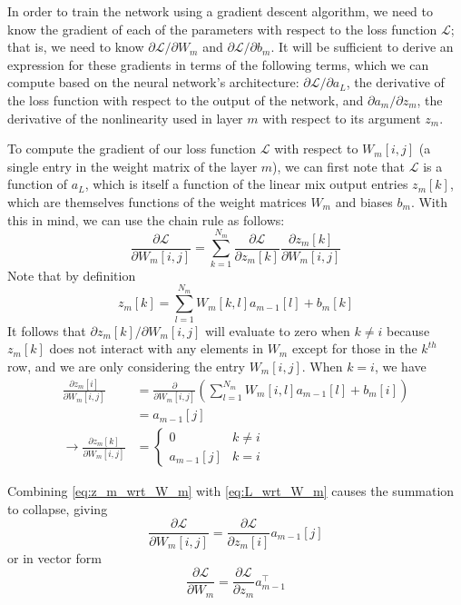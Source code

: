 In order to train the network using a gradient descent algorithm, we need to know the gradient of each of the parameters with respect to the loss function $\mathcal{L}$; that is, we need to know $\partial \mathcal{L}/\partial W_m$ and $\partial \mathcal{L}/\partial b_m$.
It will be sufficient to derive an expression for these gradients in terms of the following terms, which we can compute based on the neural network's architecture: $\partial \mathcal{L}/\partial a_L$, the derivative of the loss function with respect to the output of the network, and $\partial a_m/\partial z_m$, the derivative of the nonlinearity used in layer $m$ with respect to its argument $z_m$.

To compute the gradient of our loss function $\mathcal{L}$ with respect to $W_m[i, j]$ (a single entry in the weight matrix of the layer $m$), we can first note that $\mathcal{L}$ is a function of $a_L$, which is itself a function of the linear mix output entries $z_m[k]$, which are themselves functions of the weight matrices $W_m$ and biases $b_m$.
With this in mind, we can use the chain rule as follows:
\begin{equation}
\frac{\partial \mathcal{L}}{\partial W_m[i, j]} = \sum_{k = 1}^{N_m} \frac{\partial \mathcal{L}}{\partial z_m[k]} \frac{\partial z_m[k]}{\partial W_m[i, j]}
\label{eq:L_wrt_W_m}
\end{equation}
Note that by definition
\begin{equation}
z_m[k] = \sum_{l = 1}^{N_m} W_m[k, l] a_{m - 1}[l] + b_m[k]
\end{equation}
It follows that $\partial z_m[k]/\partial W_m[i, j]$ will evaluate to zero when $k \ne i$ because $z_m[k]$ does not interact with any elements in $W_m$ except for those in the $k^{th}$ row, and we are only considering the entry $W_m[i, j]$.
When $k = i$, we have
\begin{align}
\frac{\partial z_m[i]}{\partial W_m[i, j]} &= \frac{\partial}{\partial W_m[i, j]}\left(\sum_{l = 1}^{N_m} W_m[i, l] a_{m - 1}[l] + b_m[i]\right)\\
                                           &= a_{m - 1}[j]\\
\rightarrow \frac{\partial z_m[k]}{\partial W_m[i, j]} &= \begin{cases}
0 & k \ne i\\
a_{m - 1}[j] & k = i
\end{cases}
\label{eq:z_m_wrt_W_m}
\end{align}

Combining \cref{eq:z_m_wrt_W_m} with \cref{eq:L_wrt_W_m} causes the summation to collapse, giving
\begin{equation}
\frac{\partial \mathcal{L}}{\partial W_m[i, j]} = \frac{\partial \mathcal{L}}{\partial z_m[i]} a_{m - 1}[j]
\end{equation}
or in vector form
\begin{equation}
\frac{\partial \mathcal{L}}{\partial W_m} = \frac{\partial \mathcal{L}}{\partial z_m} a_{m - 1}^\top
\end{equation}

